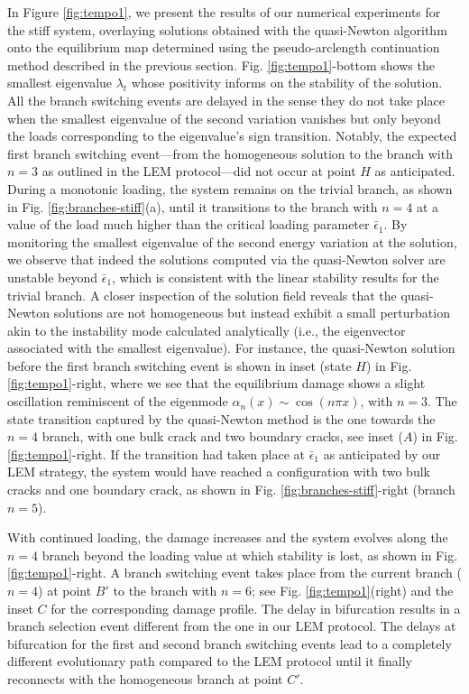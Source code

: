 In Figure \ref{fig:tempo1}, we present the results of our numerical experiments for the stiff system, overlaying solutions obtained with the quasi-Newton algorithm onto the equilibrium map determined using the pseudo-arclength continuation method described in the previous section. Fig. \ref{fig:tempo1}-bottom shows the smallest eigenvalue $\lambda_t$ whose positivity informs on the stability of the solution. All the branch switching events are delayed in the sense they do not take place when the smallest eigenvalue of the second variation vanishes but only beyond the loads corresponding to the eigenvalue's sign transition. Notably, the expected first branch switching event—from the {homogeneous} solution to the branch with \(n=3\) as outlined in the LEM protocol—did not occur at point $H$ as anticipated. During a monotonic loading, the system remains on the trivial branch, as shown in Fig. \ref{fig:branches-stiff}(a), until it transitions to the branch with \(n=4\) at a value of the load much higher than the critical loading parameter \(\bar{\epsilon}_1\). By monitoring the smallest eigenvalue of the second energy variation at the solution, we observe that indeed the solutions computed via the quasi-Newton solver are unstable beyond \(\bar{\epsilon}_1\), which is consistent with the linear stability results for the trivial branch. A closer inspection of the solution field reveals that the quasi-Newton solutions are not homogeneous but instead exhibit a small perturbation akin to the instability mode calculated analytically (i.e., the eigenvector associated with the smallest eigenvalue). For instance, the  quasi-Newton solution before the first branch switching event is shown in inset (state $H$) in Fig. \ref{fig:tempo1}-right, where we see that the equilibrium damage shows a slight oscillation reminiscent of the eigenmode \(\alpha_n(x) \sim \cos(n\pi x)\), with \(n=3\). The state transition captured by the quasi-Newton method is the one towards the \(n=4\) branch, with one bulk crack and two boundary cracks, see inset ($A$) in Fig. \ref{fig:tempo1}-right. If the transition had taken place at \(\bar{\epsilon}_1\) as anticipated by our LEM strategy, the system would have reached a configuration with two bulk cracks and one boundary crack, as shown in Fig. \ref{fig:branches-stiff}-right (branch $n=5$).

With continued loading, the damage increases and the system evolves along the \(n=4\) branch beyond the loading value at which stability is lost, as shown in Fig. \ref{fig:tempo1}-right. A  branch switching event takes place from the current branch (\(n=4\)) at point \(B'\) to the branch with \(n=6\); see Fig. \ref{fig:tempo1}(right) and the inset $C$ for the corresponding damage profile. The delay in bifurcation results in a branch selection event different from the one in our LEM protocol. The delays at bifurcation for the first and second branch switching events lead to a completely different evolutionary path compared to the LEM protocol until it finally reconnects with the homogeneous branch at point \(C'\).

